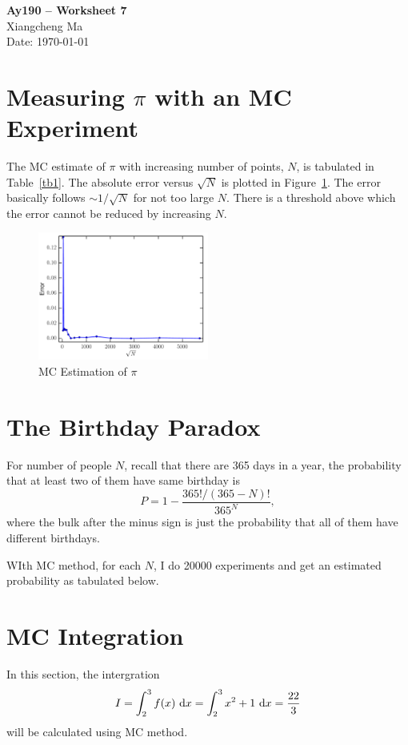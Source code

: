 \documentclass[11pt,letterpaper]{article}
\begin{document}
\begin{center}
\Large
{\bf Ay190 -- Worksheet 7} \\
\large
Xiangcheng Ma \\
Date: \today
\end{center}

\section*{Measuring $\pi$ with an MC Experiment}
The MC estimate of $\pi$ with increasing number of points, $N$, is tabulated in Table~\ref{tb1}. The absolute error versus $\sqrt{N}$ is plotted in Figure~\ref{fig1}. The error basically follows $\sim 1/\sqrt{N}$ for not too large $N$. There is a threshold above which the error cannot be reduced by increasing $N$.


\begin{figure}[ht]
\centering
\includegraphics[width=0.5\textwidth]{fig1.pdf}
\caption{MC Estimation of $\pi$}
\label{fig1}
\end{figure}


\section*{The Birthday Paradox}
For number of people $N$, recall that there are 365 days in a year, the probability that at least two of them have same birthday is 
\begin{equation}
 P = 1 - \frac{365!/(365-N)!}{365^N} ,
\end{equation}	
where the bulk after the minus sign is just the probability that all of them have different birthdays.

WIth MC method, for each $N$, I do 20000 experiments and get an estimated probability as tabulated below.



\section*{MC Integration}
In this section, the intergration
\begin{equation}
  I = \int_2^3 f(x)~{\rm d}x = \int_2^3 x^2+1~{\rm d}x = \frac{22}{3}
\end{equation}
will be calculated using MC method.
\end{document}
